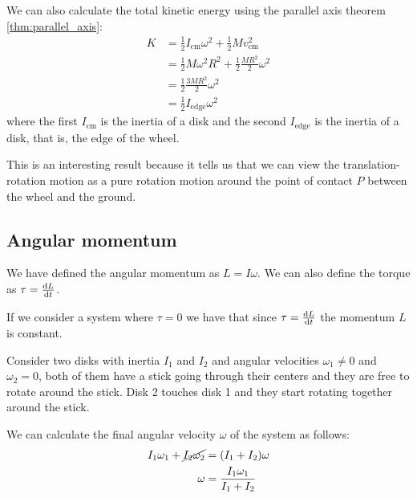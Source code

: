 \documentclass[14pt]{extarticle}
\begin{document}
We can also calculate the total kinetic energy using the parallel axis theorem \ref{thm:parallel_axis}:
\begin{align}
    K & = \frac{1}{2} I_{\text{cm}} \omega^2 + \frac{1}{2} M v_{\text{cm}}^2 \\
      & = \frac{1}{2} M \omega^2 R^2 + \frac{1}{2} \frac{M R^2}{2} \omega^2  \\
      & = \frac{1}{2} \frac{3M R^2}{2} \omega^2                              \\
      & = \frac{1}{2} I_{\text{edge}} \omega^2
\end{align}
where the first $I_{\text{cm}}$ is the inertia of a disk and the second $I_{\text{edge}}$ is the inertia of a disk, that is, the edge of the wheel.

This is an interesting result because it tells us that we can view the translation-rotation motion as a pure rotation motion around the point of contact $P$ between the wheel and the ground.

\subsection{Angular momentum}

We have defined the angular momentum as $L = I \omega$. We can also define the torque as $\tau = \dv{L}{t}$.

If we consider a system where $\tau = 0$ we have that since $\tau = \dv{L}{t}$ the momentum $L$ is constant.

\begin{example}
    Consider two disks with inertia $I_1$ and $I_2$ and angular velocities $\omega_1 \ne 0$ and $\omega_2 = 0$, both of them have a stick going through their centers and they are free to rotate around the stick.
    Disk 2 touches disk 1 and they start rotating together around the stick.

    We can calculate the final angular velocity $\omega$ of the system as follows:
    \begin{align}
        I_1 \omega_1 + \cancel{I_2 \omega_2} & = (I_1 + I_2) \omega             \\
        \omega                               & = \frac{I_1 \omega_1}{I_1 + I_2}
    \end{align}
\end{example}
\end{document}
